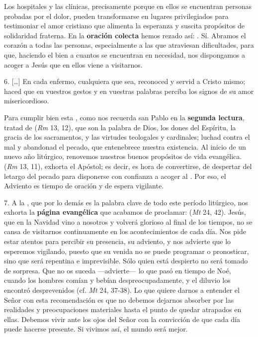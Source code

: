 \begin{body}
	Los hospitales y las clínicas, precisamente porque en ellos se encuentran personas probadas por el dolor, pueden transformarse en lugares privilegiados para testimoniar el amor cristiano que alimenta la esperanza y suscita propósitos de solidaridad fraterna. En la \textbf{oración colecta} hemos rezado así: . Sí. Abramos el corazón a todas las personas, especialmente a las que atraviesan dificultades, para que, haciendo el bien a cuantos se encuentran en necesidad, nos dispongamos a acoger a Jesús que en ellos viene a visitarnos. 
	
	6. [\ldots{}] En cada enfermo, cualquiera que sea, reconoced y servid a Cristo mismo; haced que en vuestros gestos y en vuestras palabras perciba los signos de su amor misericordioso. 
	
	Para cumplir bien esta , como nos recuerda san Pablo en la \textbf{segunda lectura}, tratad de  (\emph{Rm} 13, 12), que son la palabra de Dios, los dones del Espíritu, la gracia de los sacramentos, y las virtudes teologales y cardinales; luchad contra el mal y abandonad el pecado, que entenebrece nuestra existencia. Al inicio de un nuevo año litúrgico, renovemos nuestros buenos propósitos de vida evangélica.  (\emph{Rm} 13, 11), exhorta el Apóstol; es decir, es hora de convertirse, de despertar del letargo del pecado para disponerse con confianza a acoger al . Por eso, el Adviento es tiempo de oración y de espera vigilante. 
	
	7. A la , que por lo demás es la palabra clave de todo este período litúrgico, nos exhorta la \textbf{página evangélica} que acabamos de proclamar:  (\emph{Mt} 24, 42). Jesús, que en la Navidad vino a nosotros y volverá glorioso al final de los tiempos, no se cansa de visitarnos continuamente en los acontecimientos de cada día. Nos pide estar atentos para percibir su presencia, su adviento, y nos advierte que lo esperemos vigilando, puesto que su venida no se puede programar o pronosticar, sino que será repentina e imprevisible. Sólo quien está despierto no será tomado de sorpresa. Que no os suceda ---advierte--- lo que pasó en tiempo de Noé, cuando los hombres comían y bebían despreocupadamente, y el diluvio los encontró desprevenidos (cf. \emph{Mt} 24, 37-38). Lo que quiere darnos a entender el Señor con esta recomendación es que no debemos dejarnos absorber por las realidades y preocupaciones materiales hasta el punto de quedar atrapados en ellas. Debemos vivir ante los ojos del Señor con la convicción de que cada día puede hacerse presente. Si vivimos así, el mundo será mejor. 
	

\end{body}

